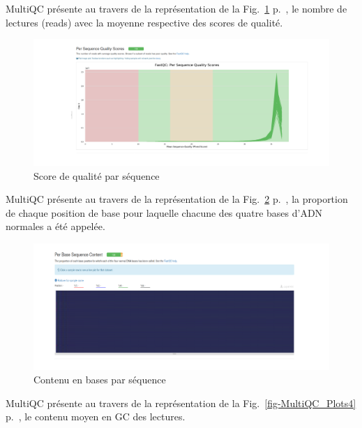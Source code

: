 \documentclass[a4paper,11pt]{article}
\begin{document}
MultiQC présente au travers de la représentation de la
Fig.~\ref{fig-MultiQC_Plots2} p.~\pageref{fig-MultiQC_Plots2}, le
nombre de lectures (reads) avec la moyenne respective des scores de
qualité.

\begin{figure}
  \begin{center}
    \includegraphics[width=16cm]{Images/MultiQC_Plots2}
  \end{center}
  \caption{Score de qualité par séquence}
  \label{fig-MultiQC_Plots2}
\end{figure}

MultiQC présente au travers de la représentation de la
Fig.~\ref{fig-MultiQC_Plots3} p.~\pageref{fig-MultiQC_Plots3}, la
proportion de chaque position de base pour laquelle chacune des quatre
bases d'ADN normales a été appelée.

\begin{figure}
  \begin{center}
    \includegraphics[width=16cm]{Images/MultiQC_Plots3}
  \end{center}
  \caption{Contenu en bases par séquence}
  \label{fig-MultiQC_Plots3}
\end{figure}

MultiQC présente au travers de la représentation de la
Fig.~\ref{fig-MultiQC_Plots4} p.~\pageref{fig-MultiQC_Plots4}, le
contenu moyen en GC des lectures.
\end{document}
